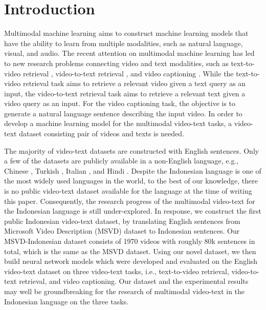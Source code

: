 \documentclass{article}
\begin{document}
\section{Introduction}


Multimodal machine learning \cite{10.1109/TPAMI.2018.2798607} aims to construct machine learning models that have the ability to learn from multiple modalities, such as natural language, visual, and audio. The recent attention on multimodal machine learning has led to new research problems connecting video and text modalities, such as text-to-video retrieval \cite{DBLP:journals/corr/TorabiTS16}, video-to-text retrieval \cite{PerezMartin2021ACR}, and video captioning \cite{venugopalan15iccv}. While the text-to-video retrieval task aims to retrieve a relevant video given a text query as an input, the video-to-text retrieval task aims to retrieve a relevant text given a video query as an input. For the video captioning task, the objective is to generate a natural language sentence describing the input video. In order to develop a machine learning model for the multimodal video-text tasks, a video-text dataset consisting pair of videos and texts is needed.

The majority of video-text datasets \cite{chen:acl11, xu2016msr-vtt, krishna2017dense} are constructed with English sentences. Only a few of the datasets are publicly available in a non-English language, e.g., Chinese \cite{Wang_2019_ICCV}, Turkish \cite{8806555}, Italian \cite{IJCOL:scaiella_et_al:2019}, and Hindi \cite{10.1007/s00530-021-00816-3}. Despite the Indonesian language is one of the most widely used languages in the world, to the best of our knowledge, there is no public video-text dataset available for the language at the time of writing this paper. Consequently, the research progress of the multimodal video-text for the Indonesian language is still under-explored. In response, we construct the first public Indonesian video-text dataset, by translating English sentences from Microsoft Video Description (MSVD) dataset \cite{chen:acl11} to Indonesian sentences. Our MSVD-Indonesian dataset consists of 1970 videos with roughly 80k sentences in total, which is the same as the MSVD dataset. Using our novel dataset, we then build neural network models which were developed and evaluated on the English video-text dataset on three video-text tasks, i.e., text-to-video retrieval, video-to-text retrieval, and video captioning. Our dataset and the experimental results may well be groundbreaking for the research of multimodal video-text in the Indonesian language on the three tasks.
\end{document}
